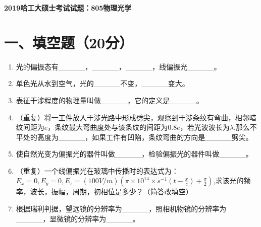 \documentclass[12pt, a4paper]{article}
\theoremstyle{solution}
\begin{document}
\begin{center}
\Large\textbf{2019哈工大硕士考试试题：805物理光学}
\end{center}





\section*{一、填空题（20分）}
\begin{enumerate}
    \item 光的偏振态有\_\_\_\_\_，\_\_\_\_\_，\_\_\_\_\_，线偏振光\_\_\_\_\_。
    \item 单色光从水到空气，光的\_\_\_\_\_不变，\_\_\_\_\_变大。
    \item 表征干涉程度的物理量叫做\_\_\_\_\_，它的定义是\_\_\_\_\_。
    \item （重复）将一工件放入干涉光路中形成劈尖，观察到干涉条纹有弯曲，相邻暗纹间距为$e$，条纹最大弯曲度处与该条纹的间距为$0.8e$，若光波波长为$\lambda$,那么不平处的高度为\_\_\_\_\_，如果工件有凹陷，条纹弯曲的方向是\_\_\_\_\_劈尖。
    \item 使自然光变为偏振光的器件叫做\_\_\_\_\_，检验偏振光的器件叫做\_\_\_\_\_。
    \item （重复）一个线偏振光在玻璃中传播时的表达式为：$E_x=0,E_y=0,E_z=(100V/m)(\pi\times10^{14}\times s^{-1}(t-\frac{x}{c})+\frac{\pi}{2})$,求该光的频率，波长，振幅，周期，初相位是多少？（简答改填空）
    \item 根据瑞利判据，望远镜的分辨率为\_\_\_\_\_，照相机物镜的分辨率为\_\_\_\_\_，显微镜的分辨率为\_\_\_\_\_。
\end{enumerate}
\end{document}
